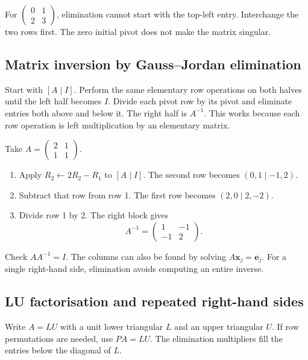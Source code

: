 \documentclass[12pt,a4paper]{article}
\begin{document}
\begin{tcolorbox}[masonbox, title={When pivoting is essential}]
For $\begin{pmatrix}0&1\\2&3\end{pmatrix}$, elimination cannot start with the top-left entry. Interchange the two rows first. The zero initial pivot does not make the matrix singular.
\end{tcolorbox}

\subsection{Matrix inversion by Gauss--Jordan elimination}
\begin{tcolorbox}[defbox, title={Gauss--Jordan inversion}]
Start with $[A\mid I]$. Perform the same elementary row operations on both halves until the left half becomes $I$. Divide each pivot row by its pivot and eliminate entries both above and below it. The right half is $A^{-1}$. This works because each row operation is left multiplication by an elementary matrix.
\end{tcolorbox}

\begin{tcolorbox}[examplebox, title={Invert a two-by-two matrix}]
Take $A=\begin{pmatrix}2&1\\1&1\end{pmatrix}$.
\begin{enumerate}[leftmargin=*, itemsep=3pt, topsep=4pt]
  \item Apply $R_2\leftarrow2R_2-R_1$ to $[A\mid I]$. The second row becomes $(0,1\mid-1,2)$.
  \item Subtract that row from row 1. The first row becomes $(2,0\mid2,-2)$.
  \item Divide row 1 by 2. The right block gives
 \[
 A^{-1}=\begin{pmatrix}1&-1\\-1&2\end{pmatrix}.
 \]
\end{enumerate}
Check $AA^{-1}=I$. The columns can also be found by solving $A\mathbf{x}_j=\mathbf{e}_j$. For a single right-hand side, elimination avoids computing an entire inverse.
\end{tcolorbox}

\subsection{LU factorisation and repeated right-hand sides}
\begin{tcolorbox}[defbox, title={Doolittle LU factorisation}]
Write $A=LU$ with a unit lower triangular $L$ and an upper triangular $U$. If row permutations are needed, use $PA=LU$. The elimination multipliers fill the entries below the diagonal of $L$.
\end{tcolorbox}
\end{document}
